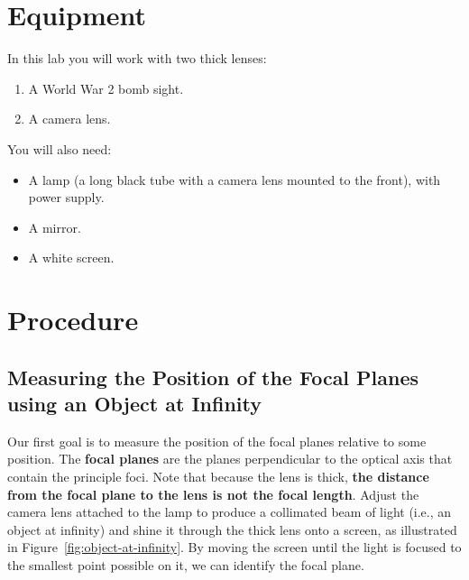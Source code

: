 \documentclass[]{manual}
\begin{document}
    \section*{Equipment}

    In this lab you will work with two thick lenses:
    \begin{enumerate}
        \item A World War 2 bomb sight.
        \item A camera lens.
    \end{enumerate}

    \noindent
    You will also need:
    \begin{itemize}
        \item A lamp (a long black tube with a camera lens mounted to the front), with power supply.
        \item A mirror.
        \item A white screen.
    \end{itemize}


    \FloatBarrier
    \newpage

    \section*{Procedure}

    \subsection{Measuring the Position of the Focal Planes using an Object at Infinity}

    Our first goal is to measure the position of the focal planes relative to some position.
    The \textbf{focal planes} are the planes perpendicular to the optical axis that contain the principle foci.
    Note that because the lens is thick, \textbf{the distance from the focal plane to the lens is not the focal length}.
    Adjust the camera lens attached to the lamp to produce a collimated beam of light (i.e., an object at infinity) and shine it through the thick lens onto a screen, as illustrated in Figure~\ref{fig:object-at-infinity}.
    By moving the screen until the light is focused to the smallest point possible on it, we can identify the focal plane.

\end{document}
